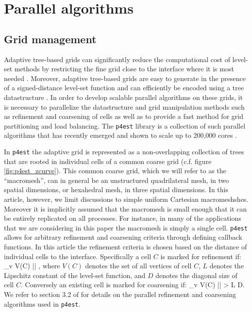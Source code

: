 \section{Parallel algorithms}\label{sec:parallel algorithms}

\subsection{Grid management}
Adaptive tree-based grids can significantly reduce the computational cost of level-set methods by restricting the fine grid close to the interface where it is most needed \cite{Strain:99:Tree-Methods-for-Mov}. Moreover, adaptive tree-based grids are easy to generate in the presence of a signed-distance level-set function \cite{Min;Gibou:07:A-second-order-accur} and can efficiently be encoded using a tree datastructure \cite{Samet:90:Applications-of-Spat}. In order to develop scalable parallel algorithms on these grids, it is necessary to parallelize the datastructure and grid manipulation methods such as refinement and coarsening of cells as well as to provide a fast method for grid partitioning and load balancing. The \texttt{p4est} library \cite{p4est-github} is a collection of such parallel algorithms that has recently emerged and shown to scale up to 200,000 cores \cite{Burstedde;Wilcox;Ghattas:11:p4est:-Scalable-Algo}.

In \texttt{p4est} the adaptive grid is represented as a non-overlapping collection of trees that are rooted in individual cells of a common coarse grid (c.f. figure \ref{fig:p4est_zcurve}). This common coarse grid, which we will refer to as the ``macromesh'', can in general be an unstructured quadrilateral mesh, in two spatial dimensions, or hexahedral mesh, in three spatial dimensions. In this article, however, we limit discussions to simple uniform Cartesian macromeshshes. Moreover it is implicitly assumed that the macromesh is small enough that it can be entirely replicated on all processes. For instance, in many of the applications that we are considering in this paper the macromesh is simply a single cell. \texttt{p4est} allows for arbitrary refinement and coarsening criteria through defining callback functions. In this article the refinement criteria is chosen based on the distance of individual cells to the interface. Specifically a cell $C$ is marked for refinement if:
\be
\min_{\forall v \in V(C)} |\phi| \le {},
\label{eq:refine}
\ee
where $V(C)$ denotes the set of all vertices of cell $C$, $L$ denotes the Lipschitz constant of the level-set function, and $D$ denotes the diagonal size of cell $C$. Conversely an existing cell is marked for coarsening if:
\be
\min_{\forall v \in V(C)} |\phi| > L D.
\label{eq:coarsen}
\ee
We refer to section 3.2 of \cite{Burstedde;Wilcox;Ghattas:11:p4est:-Scalable-Algo} for details on the parallel refinement and coarsening algorithms used in \texttt{p4est}.

